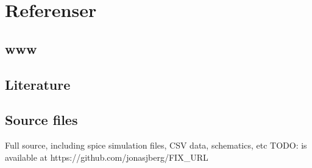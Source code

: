 \section{Referenser}\label{referenser}

\subsection{www}\label{}

\subsection{Literature}\label{}

\subsection{Source files}\label{sources}
Full source, including spice simulation files, CSV data, schematics, etc
TODO: is available at https://github.com/jonasjberg/FIX_URL
